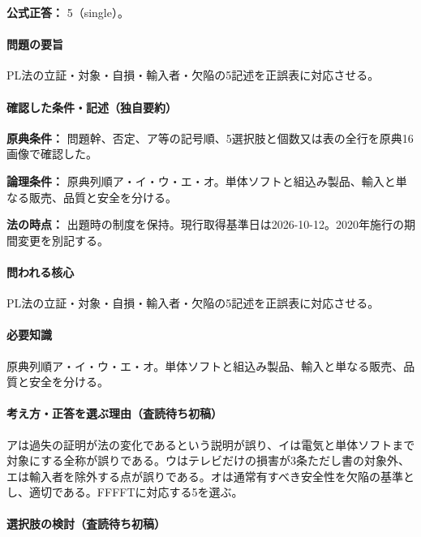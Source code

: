 \textbf{公式正答：} 5（single）。

\paragraph{問題の要旨} PL法の立証・対象・自損・輸入者・欠陥の5記述を正誤表に対応させる。

\paragraph{確認した条件・記述（独自要約）}\mbox{}\par

\noindent\textbf{原典条件：} 問題幹、否定、ア等の記号順、5選択肢と個数又は表の全行を原典16画像で確認した。\par

\noindent\textbf{論理条件：} 原典列順ア・イ・ウ・エ・オ。単体ソフトと組込み製品、輸入と単なる販売、品質と安全を分ける。\par

\noindent\textbf{法の時点：} 出題時の制度を保持。現行取得基準日は2026-10-12。2020年施行の期間変更を別記する。\par

\paragraph{問われる核心} PL法の立証・対象・自損・輸入者・欠陥の5記述を正誤表に対応させる。

\paragraph{必要知識} 原典列順ア・イ・ウ・エ・オ。単体ソフトと組込み製品、輸入と単なる販売、品質と安全を分ける。

\paragraph{考え方・正答を選ぶ理由（査読待ち初稿）} アは過失の証明が法の変化であるという説明が誤り、イは電気と単体ソフトまで対象にする全称が誤りである。ウはテレビだけの損害が3条ただし書の対象外、エは輸入者を除外する点が誤りである。オは通常有すべき安全性を欠陥の基準とし、適切である。FFFFTに対応する5を選ぶ。

\paragraph{選択肢の検討（査読待ち初稿）}\mbox{}\par

